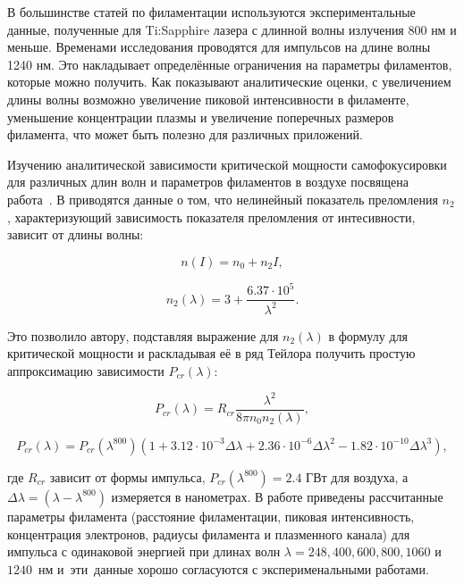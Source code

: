 В большинстве статей по филаментации используются экспериментальные данные,
полученные для Ti:Sapphire лазера с длинной волны излучения 800 нм и меньше.
Временами исследования проводятся для импульсов на длине волны 1240 нм. Это накладывает определённые ограничения
на параметры филаментов, которые можно получить. Как показывают аналитические оценки, с увеличением длины волны
возможно увеличение пиковой интенсивности в филаменте, уменьшение концентрации плазмы
и увеличение поперечных размеров филамента, что может быть полезно для различных приложений.


Изучению аналитической зависимости критической мощности самофокусировки для различных длин волн
и параметров филаментов в воздухе посвящена работа~\cite{FedorovKandidovDifferentWavelengths2008}.
В \cite{FedorovKandidovAirN22008} приводятся данные о том, что нелинейный показатель преломления $n_2$,
характеризующий зависимость показателя преломления от интесивности, зависит от длины волны:

\begin{equation*}
n(I) = n_0 + n_2 I,
\end{equation*}

\begin{equation}\label{OverviewN2}
n_2(\lambda) = 3 + \dfrac{6.37 \cdot 10^5}{\lambda^2}.
\end{equation}

Это позволило автору, подставляя выражение для $n_2(\lambda)$ в формулу для критической мощности
и раскладывая её в ряд Тейлора получить простую аппроксимацию зависимости $P_{cr}(\lambda)$:

\begin{equation}\label{OverviewP_cr}
P_{cr}(\lambda) = R_{cr}\dfrac{\lambda^2}{8 \pi n_0 n_2(\lambda)},
\end{equation}

\begin{equation}\label{OverviewP_cr_Fedorov}
P_{cr}(\lambda) = P_{cr}(\lambda^{800})(1 + 3.12 \cdot 10^{-3}\Delta\lambda + 2.36 \cdot 10^{-6}\Delta\lambda^2 - 1.82 \cdot 10^{-10}\Delta\lambda^3),
\end{equation}

\noindent где $R_{cr}$ зависит от формы импульса, $P_{cr}(\lambda^{800}) = 2.4$ ГВт для воздуха,
а $\Delta\lambda = (\lambda - \lambda^{800})$ измеряется в нанометрах.
В работе приведены рассчитанные параметры филамента
(расстояние филаментации, пиковая интенсивность, концентрация электронов, радиусы филамента и плазменного канала)
для импульса с одинаковой энергией при длинах волн $\lambda = 248, 400, 600, 800, 1060$ и $1240$~нм
и~эти~данные хорошо согласуются с эксперименальными работами.

